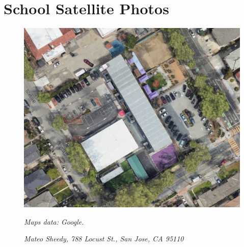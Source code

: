 \chapter{School Satellite Photos}\label{ch:ca-school-photos}

\begin{figure}[h]
  \centering
  \caption{\textit{Mateo Sheedy, 788 Locust St., San Jose, CA 95110}}\label{fig:Mateo_Sheedy_Sat_Photo}
  \includegraphics[width=\textwidth]{Mateo_Sheedy}\\ %
  \footnotesize\raggedright\textit{Maps data: Google.} 
\end{figure}

